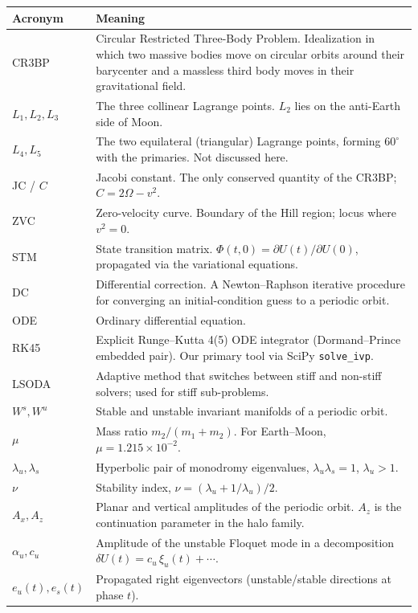 \documentclass[11pt,a4paper]{article}
\begin{document}
\begin{longtable}{@{}l p{}@{}}
\toprule
\textbf{Acronym} & \textbf{Meaning} \\
\midrule
\endhead
CR3BP  & Circular Restricted Three-Body Problem. Idealization in which two massive bodies move on circular orbits around their barycenter and a massless third body moves in their gravitational field. \\
$L_1, L_2, L_3$ & The three collinear Lagrange points. $L_2$ lies on the anti-Earth side of Moon. \\
$L_4, L_5$ & The two equilateral (triangular) Lagrange points, forming $60^\circ$ with the primaries. Not discussed here. \\
JC / $C$ & Jacobi constant. The only conserved quantity of the CR3BP; $C = 2\Omega - v^2$. \\
ZVC & Zero-velocity curve. Boundary of the Hill region; locus where $v^2 = 0$. \\
STM & State transition matrix. $\Phi(t,0) = \partial U(t) / \partial U(0)$, propagated via the variational equations. \\
DC & Differential correction. A Newton--Raphson iterative procedure for converging an initial-condition guess to a periodic orbit. \\
ODE & Ordinary differential equation. \\
RK45 & Explicit Runge--Kutta 4(5) ODE integrator (Dormand--Prince embedded pair). Our primary tool via SciPy \texttt{solve\_ivp}. \\
LSODA & Adaptive method that switches between stiff and non-stiff solvers; used for stiff sub-problems. \\
$W^s, W^u$ & Stable and unstable invariant manifolds of a periodic orbit. \\
$\mu$ & Mass ratio $m_2/(m_1+m_2)$. For Earth--Moon, $\mu = 1.215\times 10^{-2}$. \\
$\lambda_u, \lambda_s$ & Hyperbolic pair of monodromy eigenvalues, $\lambda_u \lambda_s = 1$, $\lambda_u > 1$. \\
$\nu$ & Stability index, $\nu = (\lambda_u + 1/\lambda_u)/2$. \\
$A_x, A_z$ & Planar and vertical amplitudes of the periodic orbit. $A_z$ is the continuation parameter in the halo family. \\
$\alpha_u, c_u$ & Amplitude of the unstable Floquet mode in a decomposition $\delta U(t) = c_u\,\xi_u(t) + \cdots$. \\
$e_u(t), e_s(t)$ & Propagated right eigenvectors (unstable/stable directions at phase $t$). \\

\end{longtable}
\end{document}
